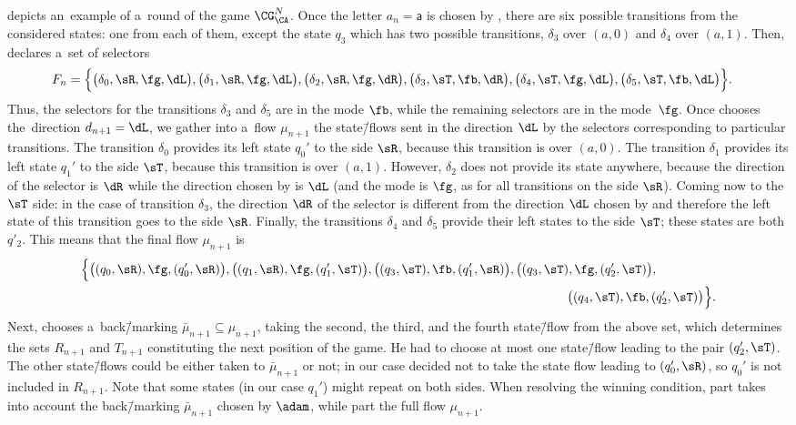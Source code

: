  depicts an~example of a~round of the game $\CG^N_\CA$.
Once the letter $a_n=\mathsf{a}$ is chosen by \eve, there are six possible transitions from the considered states:
one from each of them, except the state $q_3$ which has two possible transitions, $\delta_3$ over $(a,0)$ and $\delta_4$ over $(a,1)$.
Then, \eve declares a~set of selectors
\begin{align*}
	F_n=\Big\{&\big(\delta_0,\sR,\fg,\dL\big),\big(\delta_1,\sR,\fg,\dL\big),\big(\delta_2,\sR,\fg,\dR\big),
	\big(\delta_3,\sT,\fb,\dR\big),\big(\delta_4,\sT,\fg,\dL\big),\big(\delta_5,\sT,\fb,\dL\big)\Big\}.
\end{align*}
Thus, the selectors for the transitions $\delta_3$ and $\delta_5$ are in the mode $\fb$, while the remaining selectors are in the mode~$\fg$.
Once \adam chooses the~direction $d_{n+1}=\dL$, we gather into a~flow $\mu_{n+1}$ the state\=/flows sent in the direction $\dL$ by the selectors corresponding to particular transitions.
The transition $\delta_0$ provides its left state $q_0'$ to the side $\sR$, because this transition is over $(a,0)$.
The transition $\delta_1$ provides its left state $q_1'$ to the side $\sT$, because this transition is over $(a,1)$.
However, $\delta_2$ does not provide its state anywhere, because the direction of the selector is $\dR$ while the direction chosen by \adam is $\dL$ (and the mode is $\fg$, as for all transitions on the side $\sR$).
Coming now to the $\sT$ side: in the case of transition $\delta_3$, the direction $\dR$ of the selector is different from the direction $\dL$ chosen by \adam and therefore the left state of this transition goes to the side $\sR$.
Finally, the transitions $\delta_4$ and $\delta_5$ provide their left states to the side $\sT$; these states are both $q'_2$.
This means that the final flow $\mu_{n+1}$ is
\begin{align*}
	\Big\{\big((q_0,\sR),\fg,(q'_0,\sR)\big),\big((q_1,\sR),\fg,(q'_1,\sT)\big),\big((q_3,\sT),\fb,(q'_1,\sR)\big),\big((q_3,\sT),\fg,(q'_2,\sT)\big),&\\
	&\hspace{-7em}\big((q_4,\sT),\fb,(q'_2,\sT)\big)\Big\}.
\end{align*}
Next, \adam chooses a~back\=/marking $\bar\mu_{n+1}\subseteq\mu_{n+1}$, taking the second, the third, and the fourth state\=/flow from the above set,
which determines the sets $R_{n+1}$ and $T_{n+1}$ constituting the next position of the game.
He had to choose at most one state\=/flow leading to the pair $(q'_2,\sT)$.
The other state\=/flows could be either taken to $\bar\mu_{n+1}$ or not;
in our case \adam decided not to take the state flow leading to $(q'_0,\sR)$, so $q_0'$ is not included in $R_{n+1}$.
Note that some states (in our case $q_1'$) might repeat on both sides.
When resolving the winning condition, part  takes into account the back\=/marking $\bar\mu_{n+1}$ chosen by $\adam$, while part  the full flow $\mu_{n+1}$.



